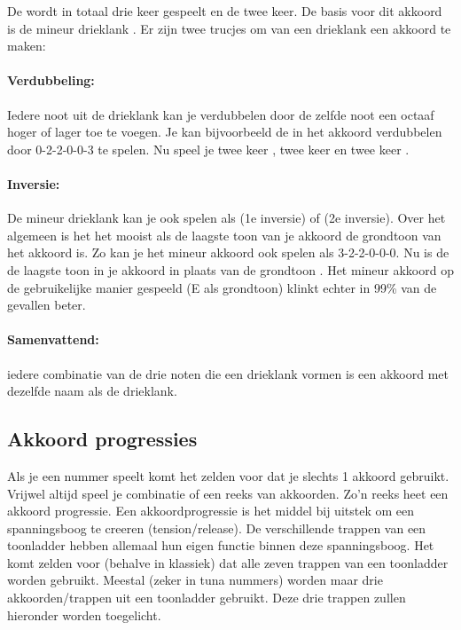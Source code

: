      

De  wordt in totaal drie keer gespeelt en de  twee keer. De basis voor dit akkoord is de  mineur drieklank   . Er zijn twee trucjes om van een drieklank een akkoord te maken:

\paragraph*{Verdubbeling:}
Iedere noot uit de drieklank kan je verdubbelen door de zelfde noot een octaaf hoger of lager toe te voegen. Je kan bijvoorbeeld de  in het  akkoord verdubbelen door 0-2-2-0-0-3 te spelen. Nu speel je twee keer , twee keer  en twee keer .

\paragraph*{Inversie:}
De  mineur drieklank    kan je ook spelen als    (1e inversie) of    (2e inversie). Over het algemeen is het het mooist als de laagste toon van je akkoord de grondtoon van het akkoord is. Zo kan je het  mineur akkoord ook spelen als 3-2-2-0-0-0. Nu is de  de laagste toon in je akkoord in plaats van de grondtoon . Het  mineur akkoord op de gebruikelijke manier gespeeld (E als grondtoon) klinkt echter in 99\% van de gevallen beter.

\paragraph*{Samenvattend:} iedere combinatie van de drie noten die een drieklank vormen is een akkoord met dezelfde naam als de drieklank.

\subsection*{Akkoord progressies}
Als je een nummer speelt komt het zelden voor dat je slechts 1 akkoord gebruikt. Vrijwel altijd speel je combinatie of een reeks van akkoorden. Zo’n reeks heet een akkoord progressie. Een akkoordprogressie is het middel bij uitstek om een spanningsboog te creeren (tension/release). De verschillende trappen van een toonladder hebben allemaal hun eigen functie binnen deze spanningsboog. Het komt zelden voor (behalve in klassiek) dat alle zeven trappen van een toonladder worden gebruikt. Meestal (zeker in tuna nummers) worden maar drie akkoorden/trappen uit een toonladder gebruikt. Deze drie trappen zullen hieronder worden toegelicht.


